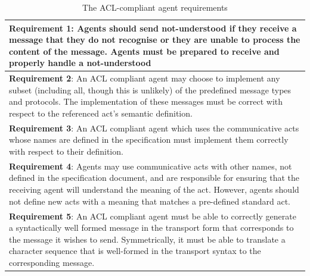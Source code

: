 \documentclass[main.tex]{subfiles}
\begin{document}
\begin{table}[htbp]
    \caption{The ACL-compliant agent requirements \cite{IntelligentPhysicalAgents2001}}
    \renewcommand{\arraystretch}{1.7}
    \centering\begin{tabular}{p{}}
\toprule
\textbf{Requirement 1}:
Agents should send not-understood if they receive a message that they do not recognise or they are unable to
process the content of the message. Agents must be prepared to receive and properly handle a not-understood
\\ \midrule
\textbf{Requirement 2}:
An ACL compliant agent may choose to implement any subset (including all, though this is
unlikely) of the predefined message types and protocols. The implementation of these messages
must be correct with respect to the referenced act's semantic definition.
 \\ \midrule
\textbf{Requirement 3}:
An ACL compliant agent which uses the communicative acts whose names are defined in the specification must
implement them correctly with respect to their definition.
\\ \midrule
\textbf{Requirement 4}:
Agents may use communicative acts with other names, not defined in the specification document,
and are responsible for ensuring that the receiving agent will understand the meaning of the
act. However, agents should not define new acts with a meaning that matches a pre-defined
standard act.
 \\ \midrule
\textbf{Requirement 5}:
An ACL compliant agent must be able to correctly generate a syntactically well formed message in the transport
form that corresponds to the message it wishes to send. Symmetrically, it must be able to translate a character
sequence that is well-formed in the transport syntax to the corresponding message.
\\ \bottomrule
    \end{tabular}
    \label{requirements}
\end{table}
\end{document}
